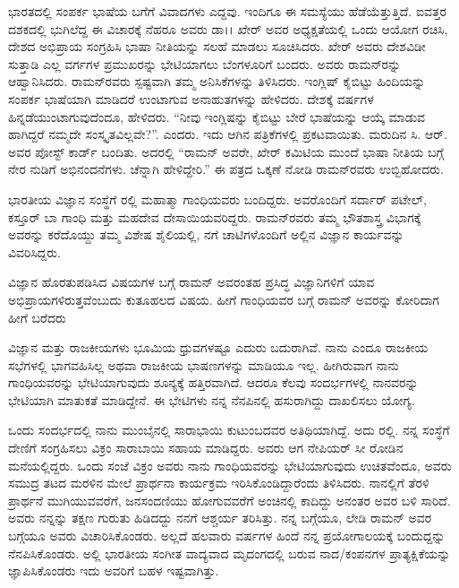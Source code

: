 ಭಾರತದಲ್ಲಿ ಸಂಪರ್ಕ ಭಾಷೆಯ ಬಗೆಗೆ ವಿವಾದಗಳು ಎದ್ದವು. ಇಂದಿಗೂ ಈ ಸಮಸ್ಯೆಯು ಹೆಡೆಯೆತ್ತುತ್ತಿದೆ. ಐವತ್ತರ ದಶಕದಲ್ಲಿ ಭುಗಿಲೆದ್ದ ಈ ವಿಚಾರಕ್ಕೆ ನೆಹರೂ ಅವರು ಡಾ।। ಖೇರ್ ಅವರ ಅಧ್ಯಕ್ಷತೆಯಲ್ಲಿ ಒಂದು ಆಯೋಗ ರಚಿಸಿ, ದೇಶದ ಅಭಿಪ್ರಾಯ ಸಂಗ್ರಹಿಸಿ ಭಾಷಾ ನೀತಿಯನ್ನು ಸಲಹೆ ಮಾಡಲು ಸೂಚಿಸಿದರು. ಖೇರ್ ಅವರು ದೇಶವಿಡೀ ಸುತ್ತಾಡಿ ಎಲ್ಲ ವರ್ಗಗಳ ಪ್ರಮುಖರನ್ನು ಭೇಟಿಯಾಗಲು ಬೆಂಗಳೂರಿಗೆ ಬಂದರು. ಅವರು ರಾಮನ್‍ರನ್ನು ಆಹ್ವಾನಿಸಿದರು. ರಾಮನ್‍ರವರು ಸ್ಪಷ್ಟವಾಗಿ ತಮ್ಮ ಅನಿಸಿಕೆಗಳನ್ನು ತಿಳಿಸಿದರು. ಇಂಗ್ಲಿಷ್ ಕೈಬಿಟ್ಟು ಹಿಂದಿಯನ್ನು ಸಂಪರ್ಕ ಭಾಷೆಯಾಗಿ ಮಾಡಿದರೆ ಉಂಟಾಗುವ ಅನಾಹುತಗಳನ್ನು ಹೇಳಿದರು. ದೇಶಕ್ಕೆ  ವರ್ಷಗಳ ಹಿನ್ನಡೆಯುಂಟಾಗುವುದೆಂದೂ, ಹೇಳಿದರು. “ನೀವು ಇಂಗ್ಲಿಷನ್ನು ಕೈಬಿಟ್ಟು ಬೇರೆ ಭಾಷೆಯನ್ನು ಆಯ್ಕೆ ಮಾಡುವ ಹಾಗಿದ್ದರೆ ನಮ್ಮದೇ ಸಂಸ್ಕೃತವಿಲ್ಲವೇ?”. ಎಂದರು. ಇದು ಆಗಿನ ಪತ್ರಿಕೆಗಳಲ್ಲಿ ಪ್ರಕಟವಾಯಿತು. ಮರುದಿನ ಸಿ. ಆರ್. ಅವರ ಪೋಸ್ಟ್ ಕಾರ್ಡ್ ಬಂದಿತು. ಅದರಲ್ಲಿ “ರಾಮನ್ ಅವರೇ, ಖೇರ್ ಕಮಿಟಿಯ ಮುಂದೆ ಭಾಷಾ ನೀತಿಯ ಬಗ್ಗೆ ನೇರ ನುಡಿಗೆ ಅಭಿನಂದನೆಗಳು. ಚೆನ್ನಾಗಿ ಹೇಳಿದ್ದೇರಿ.” ಈ ಪತ್ರದ ಒಕ್ಕಣೆ ನೋಡಿ ರಾಮನ್‍ರವರು ಉಬ್ಬಿಹೋದರು.



ಭಾರತೀಯ ವಿಜ್ಞಾನ ಸಂಸ್ಥೆಗೆ ರಲ್ಲಿ ಮಹಾತ್ಮಾ ಗಾಂಧಿಯವರು ಬಂದಿದ್ದರು. ಅವರೊಂದಿಗೆ ಸರ್ದಾರ್ ಪಟೇಲ್, ಕಸ್ತೂರ್ ಬಾ ಗಾಂಧಿ ಮತ್ತು ಮಹದೇವ ದೇಸಾಯಿಯವರಿದ್ದರು. ರಾಮನ್‍ರವರು ತಮ್ಮ ಭೌತಶಾಸ್ತ್ರ ವಿಭಾಗಕ್ಕೆ ಅವರನ್ನು ಕರೆದೊಯ್ದು ತಮ್ಮ ವಿಶೇಷ ಶೈಲಿಯಲ್ಲಿ, ನಗೆ ಚಾಟಿಗಳೊಂದಿಗೆ ಅಲ್ಲಿನ ವಿಜ್ಞಾನ ಕಾರ್ಯವನ್ನು ವಿವರಿಸಿದ್ದರು.

ವಿಜ್ಞಾನ ಹೊರತುಪಡಿಸಿದ ವಿಷಯಗಳ ಬಗ್ಗೆ ರಾಮನ್ ಅವರಂತಹ ಪ್ರಸಿದ್ಧ ವಿಜ್ಞಾನಿಗಳಿಗೆ ಯಾವ ಅಭಿಪ್ರಾಯಗಳಿರುತ್ತವೆಂಬುದು ಕುತೂಹಲದ ವಿಷಯ. ಹೀಗೆ ಗಾಂಧಿಯವರ ಬಗ್ಗೆ ರಾಮನ್ ಅವರನ್ನು ಕೋರಿದಾಗ ಹೀಗೆ ಬರೆದರು\enginline{-}

ವಿಜ್ಞಾನ ಮತ್ತು ರಾಜಕೀಯಗಳು ಭೂಮಿಯ ಧ್ರುವಗಳಷ್ಟೂ ಎದುರು ಬದುರಾಗಿವೆ. ನಾನು ಎಂದೂ ರಾಜಕೀಯ ಸಭೆಗಳಲ್ಲಿ ಭಾಗವಹಿಸಿಲ್ಲ ಅಥವಾ ರಾಜಕೀಯ ಭಾಷಣಗಳನ್ನು ಮಾಡಿಯೂ ಇಲ್ಲ. ಹೀಗಿರುವಾಗ ನಾನು ಗಾಂಧಿಯವರನ್ನು ಭೇಟಿಯಾಗುವುದು ಶೂನ್ಯಕ್ಕೆ ಹತ್ತಿರವಾಗಿದೆ. ಆದರೂ ಕೆಲವು ಸಂದರ್ಭಗಳಲ್ಲಿ ನಾನವರನ್ನು ಭೇಟಿಯಾಗಿ ಮಾತುಕತೆ ಮಾಡಿದ್ದೇನೆ. ಈ ಭೇಟಿಗಳು ನನ್ನ ನೆನಪಿನಲ್ಲಿ ಹಸುರಾಗಿದ್ದು ದಾಖಲಿಸಲು ಯೋಗ್ಯ.

ಒಂದು ಸಂದರ್ಭದಲ್ಲಿ ನಾನು ಮುಂಬೈನಲ್ಲಿ ಸಾರಾಭಾಯಿ ಕುಟುಂಬದವರ ಅತಿಥಿಯಾಗಿದ್ದೆ. ಅದು ರಲ್ಲಿ. ನನ್ನ ಸಂಸ್ಥೆಗೆ ದೇಣಿಗೆ ಸಂಗ್ರಹಿಸಲು ವಿಕ್ರಂ ಸಾರಾಬಾಯಿ ಸಹಾಯ ಮಾಡಿದ್ದರು. ಅವರು ಆಗ ನೇಪಿಯರ್ ಸೀ ರೋಡಿನ ಮನೆಯಲ್ಲಿದ್ದರು. ಒಂದು ಸಂಜೆ ವಿಕ್ರಂ ಅವರು ನಾನು ಗಾಂಧಿಯವರನ್ನು ಭೇಟಿಯಾಗುವುದು ಉಚಿತವೆಂದೂ, ಅವರು ಸಮುದ್ರ ತಟದ ಮರಳಿನ ಮೇಲೆ ಪ್ರಾರ್ಥನಾ ಕಾರ್ಯಕ್ರಮ ಇರಿಸಿಕೊಂಡಿದ್ದಾರೆಂದು ತಿಳಿಸಿದರು. ನಾನಲ್ಲಿಗೆ ತೆರಳಿ ಪ್ರಾರ್ಥನೆ ಮುಗಿಯುವವರೆಗೆ, ಜನಸಂದಣಿಯು ಹೋಗುವವರೆಗೆ ಅಂಚಿನಲ್ಲಿ ಕಾದಿದ್ದು ಅನಂತರ ಅವರ ಬಳಿ ಸಾರಿದೆ. ಅವರು ನನ್ನನ್ನು ತಕ್ಷಣ ಗುರುತು ಹಿಡಿದದ್ದು ನನಗೆ ಆಶ್ಚರ್ಯ ತರಿಸಿತ್ತು. ನನ್ನ ಬಗ್ಗೆಯೂ, ಲೇಡಿ ರಾಮನ್ ಅವರ ಬಗ್ಗೆಯೂ ಅವರು ವಿಚಾರಿಸಿಕೊಂಡರು. ಅಲ್ಲದೆ ಹಲವಾರು ವರ್ಷಗಳ ಹಿಂದೆ ನನ್ನ ಪ್ರಯೋಗಾಲಯಕ್ಕೆ ಬಂದುದ್ದನ್ನು ನೆನಪಿಸಿಕೊಂಡರು. ಅಲ್ಲಿ ಭಾರತೀಯ ಸಂಗೀತ ವಾದ್ಯವಾದ ಮೃದಂಗದಲ್ಲಿ ಬರುವ ನಾದ/ಕಂಪನಗಳ ಪ್ರಾತ್ಯಕ್ಷಿಕೆಯನ್ನು ಜ್ಞಾಪಿಸಿಕೊಂಡರು ಇದು ಅವರಿಗೆ ಬಹಳ ಇಷ್ಟವಾಗಿತ್ತು.

